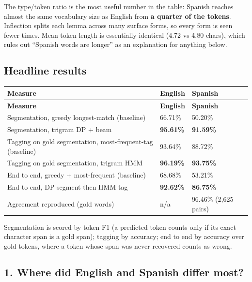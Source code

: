\documentclass[11pt,a4paper]{article}
\begin{document}
The type/token ratio is the most useful number in the table: Spanish reaches almost the same vocabulary size as English from \textbf{a quarter of the tokens}. Inflection splits each lemma across many surface forms, so every form is seen fewer times. Mean token length is essentially identical (4.72 vs 4.80 chars), which rules out ``Spanish words are longer'' as an explanation for anything below.

\subsection*{Headline results}

{\small
\setlength{\tabcolsep}{4pt}
\begin{xltabular}{\linewidth}{>{\raggedright\arraybackslash}Xll}
\toprule
\textbf{Measure} & \textbf{English} & \textbf{Spanish} \\
\midrule
\endfirsthead
\toprule
\textbf{Measure} & \textbf{English} & \textbf{Spanish} \\
\midrule
\endhead
Segmentation, greedy longest-match (baseline) & 66.71\% & 50.20\% \\
Segmentation, trigram DP + beam & \textbf{95.61\%} & \textbf{91.59\%} \\
Tagging on gold segmentation, most-frequent-tag (baseline) & 93.64\% & 88.72\% \\
Tagging on gold segmentation, trigram HMM & \textbf{96.19\%} & \textbf{93.75\%} \\
End to end, greedy + most-frequent (baseline) & 68.68\% & 53.21\% \\
End to end, DP segment then HMM tag & \textbf{92.62\%} & \textbf{86.75\%} \\
Agreement reproduced (gold words) & n/a & 96.46\% (2,625 pairs) \\
\bottomrule
\end{xltabular}}

Segmentation is scored by token F1 (a predicted token counts only if its exact character span is a gold span); tagging by accuracy; end to end by accuracy over gold tokens, where a token whose span was never recovered counts as wrong.

\clearpage
\subsection*{1. Where did English and Spanish differ most?}
\end{document}

